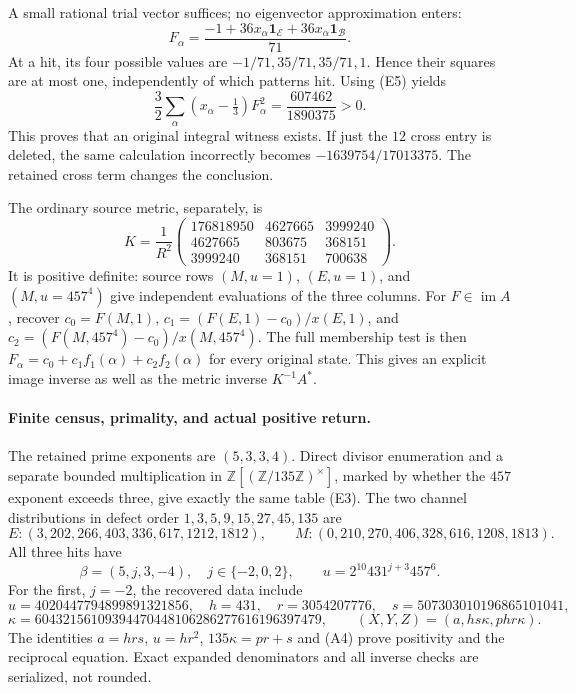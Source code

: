 A small rational trial vector suffices; no eigenvector approximation enters:
\[
 F_\alpha=\frac{-1+36x_\alpha\mathbf1_{\mathcal E}
                         +36x_\alpha\mathbf1_{\mathcal B}}{71}.
 \tag{E7}
\]
At a hit, its four possible values are $-1/71,35/71,35/71,1$.
Hence their squares are at most one, independently of which patterns hit.
Using (E5) yields
\[
 \boxed{\frac32\sum_\alpha(x_\alpha-\tfrac13)F_\alpha^2
      =\frac{607462}{1890375}>0.}\tag{E8}
\]
This proves that an original integral witness exists. If just the $12$ cross
entry is deleted, the same calculation incorrectly becomes
$-1639754/17013375$. The retained cross term changes the conclusion.

The ordinary source metric, separately, is
\[
 K=\frac1{R^2}
 \begin{pmatrix}
176818950&4627665&3999240\\
4627665&803675&368151\\
3999240&368151&700638
 \end{pmatrix}.
 \tag{E9}
\]
It is positive definite: source rows $(M,u=1)$, $(E,u=1)$, and
$(M,u=457^4)$ give independent evaluations of the three columns.
For $F\in\operatorname{im}A$, recover
$c_0=F(M,1)$,
$c_1=(F(E,1)-c_0)/x(E,1)$,
and $c_2=(F(M,457^4)-c_0)/x(M,457^4)$.
The full membership test is then $F_\alpha=c_0+c_1f_1(\alpha)+c_2f_2(\alpha)$
for every original state. This gives an explicit image inverse as well as
the metric inverse $K^{-1}A^*$.

\paragraph{Finite census, primality, and actual positive return.}
The retained prime exponents are $(5,3,3,4)$. Direct divisor enumeration and a
separate bounded multiplication in
$\mathbb Z[(\mathbb Z/135\mathbb Z)^\times]$, marked by whether the $457$
exponent exceeds three, give exactly the same table (E3).
The two channel distributions in defect order $1,3,5,9,15,27,45,135$ are
\[
 E:(3,202,266,403,336,617,1212,1812),\qquad
 M:(0,210,270,406,328,616,1208,1813).
\]
All three hits have
\[
 \beta=(5,j,3,-4),\quad j\in\{-2,0,2\},\qquad
 u=2^{10}431^{j+3}457^6.
\]
For the first, $j=-2$, the recovered data include
\[
 u=4020447794899891321856,\quad h=431,\quad r=3054207776,\quad
 s=507303010196865101041,
\]
\[
 \kappa=60432156109394470448106286277616196397479,
 \qquad (X,Y,Z)=(a,hs\kappa,phr\kappa).
 \tag{E10}
\]
The identities $a=hrs$, $u=hr^2$, $135\kappa=pr+s$ and (A4) prove
positivity and the reciprocal equation. Exact expanded denominators and all
inverse checks are serialized, not rounded.

